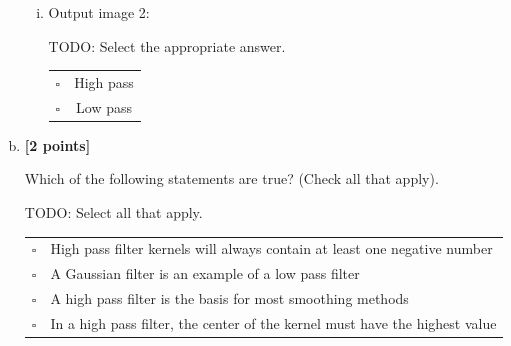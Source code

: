 \begin{enumerate}[(a)]
\begin{enumerate}[(i)]
\item
Output image 2:\\
\begin{tcolorbox}[colback=white!5!white,colframe=green!75!black]
TODO: Select the appropriate answer.

\begin{tabular}[h]{lc}
$\square$ & High pass \\
$\square$ & Low pass \\
\end{tabular}
\end{tcolorbox}
\end{enumerate}

\item \textbf{[2 points]}
\begin{tcolorbox}[colback=orange!5!white,colframe=orange!75!black]
Which of the following statements are true? (Check all that apply).
\end{tcolorbox}

\begin{tcolorbox}[colback=white!5!white,colframe=green!75!black]
TODO: Select all that apply.

\begin{tabular}[h]{ll}
$\square$ & High pass filter kernels will always contain at least one negative number \\
$\square$ & A Gaussian filter is an example of a low pass filter \\
$\square$ & A high pass filter is the basis for most smoothing methods \\
$\square$ & In a high pass filter, the center of the kernel must have the highest value \\
\end{tabular}
\end{tcolorbox}

\end{enumerate}



